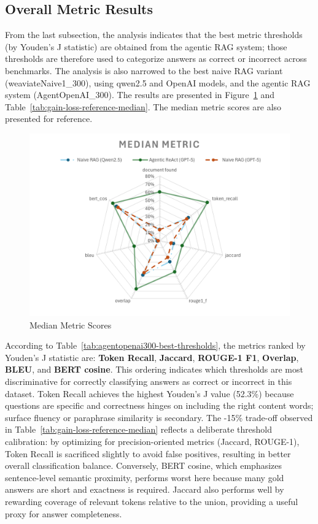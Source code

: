 \subsection{Overall Metric Results}
From the last subsection, the analysis indicates that the best metric thresholds (by Youden's J statistic) are obtained from the agentic RAG system; those thresholds are therefore used to categorize answers as correct or incorrect across benchmarks. The analysis is also narrowed to the best naive RAG variant (weaviateNaive1\_300), using qwen2.5 and OpenAI models, and the agentic RAG system (AgentOpenAI\_300). The results are presented in Figure~\ref{fig:median-metric} and Table~\ref{tab:gain-loss-reference-median}. The median metric scores are also presented for reference.
\begin{figure}
    \centering
    \includegraphics[width=0.75\linewidth]{Figures/Median Metric.png}
    \caption{Median Metric Scores}\label{fig:median-metric}
\end{figure}
According to Table~\ref{tab:agentopenai300-best-thresholds}, the metrics ranked by Youden's J statistic are: \textbf{Token Recall}, \textbf{Jaccard}, \textbf{ROUGE-1 F1}, \textbf{Overlap}, \textbf{BLEU}, and \textbf{\gls{BERT} cosine}. This ordering indicates which thresholds are most discriminative for correctly classifying answers as correct or incorrect in this dataset. Token Recall achieves the highest Youden's J value (52.3\%) because questions are specific and correctness hinges on including the right content words; surface fluency or paraphrase similarity is secondary. The -15\% trade-off observed in Table~\ref{tab:gain-loss-reference-median} reflects a deliberate threshold calibration: by optimizing for precision-oriented metrics (Jaccard, ROUGE-1), Token Recall is sacrificed slightly to avoid false positives, resulting in better overall classification balance. Conversely, \gls{BERT} cosine, which emphasizes sentence-level semantic proximity, performs worst here because many gold answers are short and exactness is required. Jaccard also performs well by rewarding coverage of relevant tokens relative to the union, providing a useful proxy for answer completeness.

